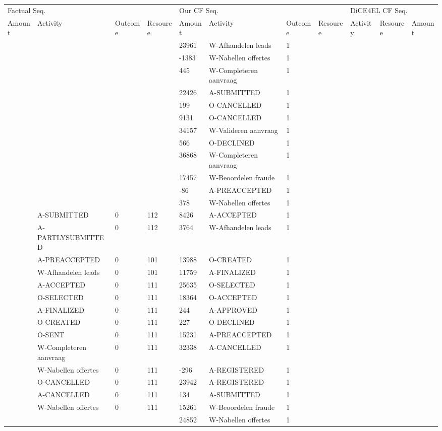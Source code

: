 \begin{tabular}{lllllllllll}
\toprule
\multicolumn{4}{l}{Factual Seq.} & \multicolumn{4}{l}{Our CF Seq.} & \multicolumn{3}{l}{DiCE4EL CF Seq.} \\
Amount & Activity & Outcome & Resource & Amount & Activity & Outcome & Resource & Activity & Resource & Amount \\
\midrule
 &  &  &  & 23961 & W-Afhandelen leads & 1 &  &  &  &  \\
 &  &  &  & -1383 & W-Nabellen offertes & 1 &  &  &  &  \\
 &  &  &  & 445 & W-Completeren aanvraag & 1 &  &  &  &  \\
 &  &  &  & 22426 & A-SUBMITTED & 1 &  &  &  &  \\
 &  &  &  & 199 & O-CANCELLED & 1 &  &  &  &  \\
 &  &  &  & 9131 & O-CANCELLED & 1 &  &  &  &  \\
 &  &  &  & 34157 & W-Valideren aanvraag & 1 &  &  &  &  \\
 &  &  &  & 566 & O-DECLINED & 1 &  &  &  &  \\
 &  &  &  & 36868 & W-Completeren aanvraag & 1 &  &  &  &  \\
 &  &  &  & 17457 & W-Beoordelen fraude & 1 &  &  &  &  \\
 &  &  &  & -86 & A-PREACCEPTED & 1 &  &  &  &  \\
 &  &  &  & 378 & W-Nabellen offertes & 1 &  &  &  &  \\
 & A-SUBMITTED & 0 & 112 & 8426 & A-ACCEPTED & 1 &  &  &  &  \\
 & A-PARTLYSUBMITTED & 0 & 112 & 3764 & W-Afhandelen leads & 1 &  &  &  &  \\
 & A-PREACCEPTED & 0 & 101 & 13988 & O-CREATED & 1 &  &  &  &  \\
 & W-Afhandelen leads & 0 & 101 & 11759 & A-FINALIZED & 1 &  &  &  &  \\
 & A-ACCEPTED & 0 & 111 & 25635 & O-SELECTED & 1 &  &  &  &  \\
 & O-SELECTED & 0 & 111 & 18364 & O-ACCEPTED & 1 &  &  &  &  \\
 & A-FINALIZED & 0 & 111 & 244 & A-APPROVED & 1 &  &  &  &  \\
 & O-CREATED & 0 & 111 & 227 & O-DECLINED & 1 &  &  &  &  \\
 & O-SENT & 0 & 111 & 15231 & A-PREACCEPTED & 1 &  &  &  &  \\
 & W-Completeren aanvraag & 0 & 111 & 32338 & A-CANCELLED & 1 &  &  &  &  \\
 & W-Nabellen offertes & 0 & 111 & -296 & A-REGISTERED & 1 &  &  &  &  \\
 & O-CANCELLED & 0 & 111 & 23942 & A-REGISTERED & 1 &  &  &  &  \\
 & A-CANCELLED & 0 & 111 & 134 & A-SUBMITTED & 1 &  &  &  &  \\
 & W-Nabellen offertes & 0 & 111 & 15261 & W-Beoordelen fraude & 1 &  &  &  &  \\
 &  &  &  & 24852 & W-Nabellen offertes & 1 &  &  &  &  \\
\bottomrule
\end{tabular}
